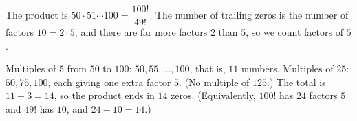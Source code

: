 The product is $50\cdot51\cdots100=\dfrac{100!}{49!}$. The number of trailing zeros is the number of factors $10=2\cdot5$, and there are far more factors $2$ than $5$, so we count factors of $5$.

Multiples of $5$ from $50$ to $100$: $50,55,\dots,100$, that is, $11$ numbers. Multiples of $25$: $50,75,100$, each giving one extra factor $5$. (No multiple of $125$.) The total is $11+3=14$, so the product ends in $\boxed{14}$ zeros. (Equivalently, $100!$ has $24$ factors $5$ and $49!$ has $10$, and $24-10=14$.)
